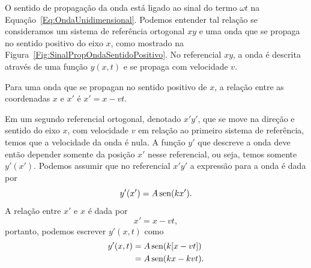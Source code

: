 O sentido de propagação da onda está ligado ao sinal do termo $\omega t$ na Equação~\eqref{Eq:OndaUnidimensional}. Podemos entender tal relação se consideramos um sistema de referência ortogonal $xy$ e uma onda que se propaga no sentido positivo do eixo $x$, como mostrado na Figura~\ref{Fig:SinalPropOndaSentidoPositivo}. No referencial $xy$, a onda é descrita através de uma função $y(x,t)$ e se propaga com velocidade $v$.

\begin{marginfigure}
\centering
{}
\caption{Para uma onda que se propagan no sentido positivo de $x$, a relação entre as coordenadas $x$ e $x'$ é $x' = x - vt$.\label{Fig:SinalPropOndaSentidoPositivo}}
\end{marginfigure}

Em um segundo referencial ortogonal, denotado $x'y'$, que se move na direção e sentido do eixo $x$, com velocidade $v$ em relação ao primeiro sistema de referência, temos que a velocidade da onda é nula. A função $y'$ que descreve a onda deve então depender somente da posição $x'$ nesse referencial, ou seja, temos somente $y'(x')$. Podemos assumir que no referencial $x'y'$ a expressão para a onda é dada por
\begin{equation}
    y'(x') = A\operatorname{sen}(kx').
\end{equation}
%
A relação entre $x'$ e $x$ é dada por
\begin{equation}
    x' = x - vt,
\end{equation}
%
portanto, podemos escrever $y'(x,t)$ como
\begin{align}
    y'(x,t) &= A\operatorname{sen}(k[x - vt]) \\
    &= A\operatorname{sen}(kx - kvt).
\end{align}    


